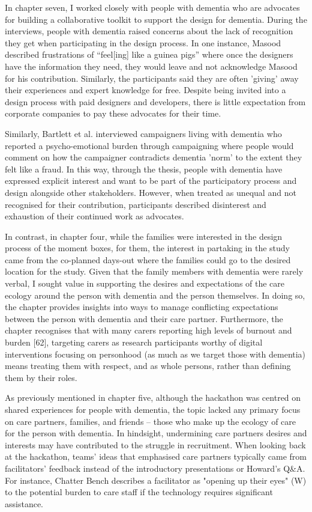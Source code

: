 In chapter seven, I worked closely with people with dementia who are advocates for building a collaborative toolkit to support the design for dementia. During the interviews, people with dementia raised concerns about the lack of recognition they get when participating in the design process. In one instance, Masood described frustrations of ``feel[ing] like a guinea pigs'' where once the designers have the information they need, they would leave and not acknowledge Masood for his contribution. Similarly, the participants said they are often 'giving' away their experiences and expert knowledge for free. Despite being invited into a design process with paid designers and developers, there is little expectation from corporate companies to pay these advocates for their time.

Similarly, Bartlett et al. interviewed campaigners living with dementia who reported a psycho-emotional burden through campaigning where people would comment on how the campaigner contradicts dementia 'norm' to the extent they felt like a fraud. In this way, through the thesis, people with dementia have expressed explicit interest and want to be part of the participatory process and design alongside other stakeholders. However, when treated as unequal and not recognised for their contribution, participants described disinterest and exhaustion of their continued work as advocates. 

In contrast, in chapter four, while the families were interested in the design process of the moment boxes, for them, the interest in partaking in the study came from the co-planned days-out where the families could go to the desired location for the study. Given that the family members with dementia were rarely verbal, I sought value in supporting the desires and expectations of the care ecology around the person with dementia and the person themselves. In doing so, the chapter provides insights into ways to manage conflicting expectations between the person with dementia and their care partner. Furthermore, the chapter recognises that with many carers reporting high levels of burnout and burden [62],  targeting carers as research participants worthy of digital interventions focusing on personhood (as much as we target those with dementia) means treating them with respect, and as whole persons, rather than defining them by their roles. 

As previously mentioned in chapter five, although the hackathon was centred on shared experiences for people with dementia, the topic lacked any primary focus on care partners, families, and friends – those who make up the ecology of care for the person with dementia. In hindsight, undermining care partners desires and interests may have contributed to the struggle in recruitment. When looking back at the hackathon, teams' ideas that emphasised care partners typically came from facilitators' feedback instead of the introductory presentations or Howard's Q&A. For instance, Chatter Bench describes a facilitator as "opening up their eyes" (W) to the potential burden to care staff if the technology requires significant assistance. 


